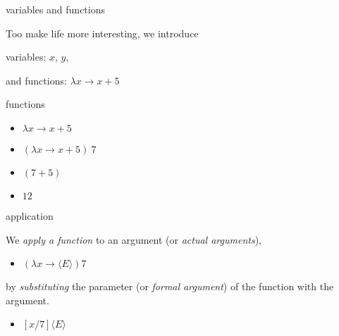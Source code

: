 \begin{frame}{variables and functions}


Too make life more interesting, we introduce 

\vspace{10pt}\hspace{40pt}variables: $x$, $y$, 

\vspace{10pt}\hspace{40pt}and functions: $\lambda x \rightarrow x+5$

\pause

\vspace{20pt}{\em Most often written $\lambda x.x+5$ but we will use $\rightarrow$.}

\pause

\vspace{20pt}{\em So far, functions do not have names.}

\end{frame}


\begin{frame}{functions}
  \begin{itemize}
   \pause \item $\lambda x \rightarrow x + 5$
   \pause \item $(\lambda x \rightarrow x + 5) \ 7$
   \pause \item $(7 + 5)$
   \pause \item $12$
  \end{itemize}
\end{frame}

\begin{frame}{application}

We {\em apply a function} to an argument (or {\em actual arguments}),
\vspace{10pt}

  \begin{itemize}
   \pause \item $(\lambda x \rightarrow \langle E \rangle) 7$
  \end{itemize}

\pause\vspace{10pt}
by {\em substituting} the parameter (or {\em formal argument}) of the function with the argument.

\pause\vspace{10pt}
\begin{itemize}
  \item $[x/7]\langle E \rangle$
\end{itemize}
\end{frame}

